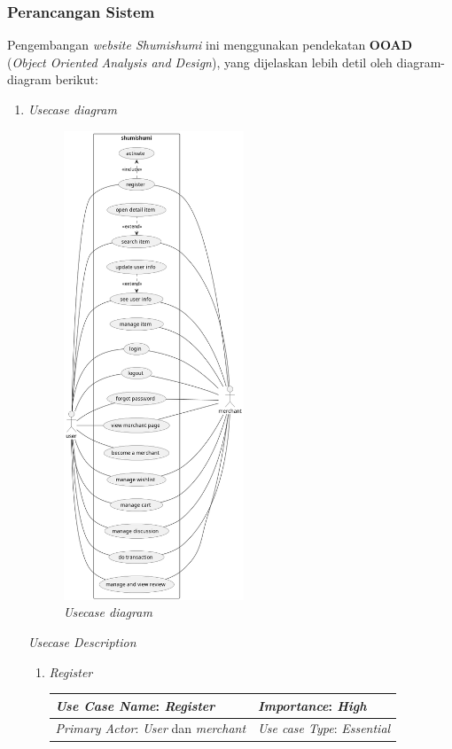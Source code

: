 \documentclass[a4paper]{article}
\newcommand{\subsubbab}[1]{%
    \subsubsection{#1}%
}
\begin{document}
\newpage
\subsubbab{Perancangan Sistem}
Pengembangan \textit{website Shumishumi} ini menggunakan pendekatan \textbf{OOAD} (\textit{Object Oriented Analysis and Design}), yang dijelaskan lebih detil oleh diagram-diagram berikut:
\begin{enumerate}
    \item \textit{Usecase diagram}
    \begin{figure}[h]
        \centering
        \includegraphics*[height=14cm]{diagram/usecase diagram/usecase diagram.png}
        \caption{\textit{Usecase diagram}}
    \end{figure}
    \newpage
    \textit{Usecase Description}
    \begin{enumerate}
        \item \textit{Register}\\
        \begin{table}[h]
            \centering
            \begin{tabular}{|lll}
            \hline
            \multicolumn{1}{|l|}{\textit{Use Case Name}: \textit{Register}}             & \multicolumn{2}{l|}{\textit{Importance}: \textit{High}}   \\ \hline
            \multicolumn{1}{|l|}{\textit{Primary Actor}: \textit{User} dan \textit{merchant}}             & \multicolumn{2}{l|}{\textit{Use case Type}: \textit{Essential}} \\ \hline

\end{tabular}
\end{table}
\end{enumerate}
\end{enumerate}
\end{document}
